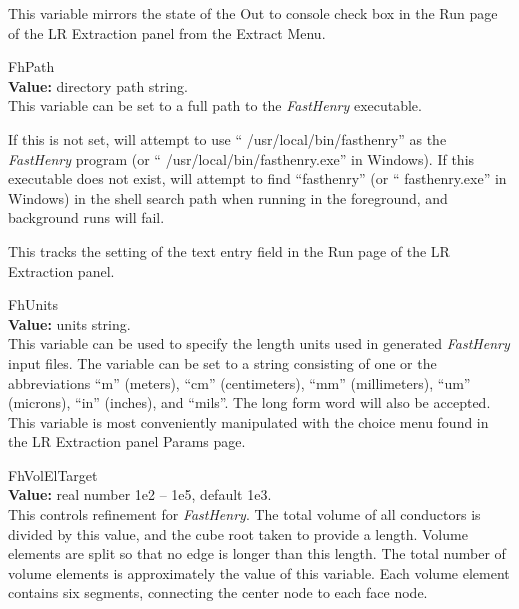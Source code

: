 \begin{description}
This variable mirrors the state of the {\cb Out to console} check box
in the {\cb Run} page of the {\cb LR Extraction} panel from the {\cb
Extract Menu}.

\item{\et FhPath}\\
{\bf Value:} directory path string.\\
This variable can be set to a full path to the {\it FastHenry} executable.

If this is not set, {\Xic} will attempt to use ``{\vt
/usr/local/bin/fasthenry}'' as the {\it FastHenry} program (or ``{\vt
/usr/local/bin/fasthenry.exe}'' in Windows).  If this executable does
not exist, {\Xic} will attempt to find ``{\vt fasthenry}'' (or ``{\vt
fasthenry.exe}'' in Windows) in the shell search path when running in
the foreground, and background runs will fail.

This tracks the setting of the text entry field in the {\cb Run} page
of the {\cb LR Extraction} panel.

\item{\et FhUnits}\\
{\bf Value:} units string.\\
This variable can be used to specify the length units used in
generated {\it FastHenry} input files.  The variable can be set to a
string consisting of one or the abbreviations ``{\vt m}'' (meters),
``{\vt cm}'' (centimeters), ``{\vt mm}'' (millimeters), ``{\vt um}''
(microns), ``{\vt in}'' (inches), and ``{\vt mils}''.  The long form
word will also be accepted.  This variable is most conveniently
manipulated with the choice menu found in the {\cb LR Extraction}
panel {\cb Params} page.

\item{\et FhVolElTarget}\\
{\bf Value:} real number 1e2 -- 1e5, default 1e3.\\
This controls refinement for {\it FastHenry}.  The total volume of all
conductors is divided by this value, and the cube root taken to
provide a length.  Volume elements are split so that no edge is longer
than this length.  The total number of volume elements is
approximately the value of this variable.  Each volume element
contains six segments, connecting the center node to each face node.
\end{description}


